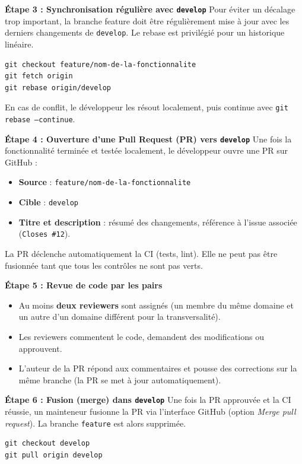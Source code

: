 \documentclass[11pt,a4paper]{article}
\begin{document}
\begin{etapebox}
\textbf{Étape 3 : Synchronisation régulière avec \texttt{develop}}
Pour éviter un décalage trop important, la branche feature doit être régulièrement mise à jour avec les derniers changements de \texttt{develop}. Le rebase est privilégié pour un historique linéaire.
\begin{verbatim}
git checkout feature/nom-de-la-fonctionnalite
git fetch origin
git rebase origin/develop
\end{verbatim}
En cas de conflit, le développeur les résout localement, puis continue avec \texttt{git rebase --continue}.
\end{etapebox}

\begin{etapebox}
\textbf{Étape 4 : Ouverture d’une Pull Request (PR) vers \texttt{develop}}
Une fois la fonctionnalité terminée et testée localement, le développeur ouvre une PR sur GitHub :
\begin{itemize}
    \item \textbf{Source} : \texttt{feature/nom-de-la-fonctionnalite}
    \item \textbf{Cible} : \texttt{develop}
    \item \textbf{Titre et description} : résumé des changements, référence à l’issue associée (\texttt{Closes \#12}).
\end{itemize}
La PR déclenche automatiquement la CI (tests, lint). Elle ne peut pas être fusionnée tant que tous les contrôles ne sont pas verts.
\end{etapebox}

\begin{etapebox}
\textbf{Étape 5 : Revue de code par les pairs}
\begin{itemize}
    \item Au moins \textbf{deux reviewers} sont assignés (un membre du même domaine et un autre d’un domaine différent pour la transversalité).
    \item Les reviewers commentent le code, demandent des modifications ou approuvent.
    \item L’auteur de la PR répond aux commentaires et pousse des corrections sur la même branche (la PR se met à jour automatiquement).
\end{itemize}
\end{etapebox}

\begin{etapebox}
\textbf{Étape 6 : Fusion (merge) dans \texttt{develop}}
Une fois la PR approuvée et la CI réussie, un mainteneur fusionne la PR via l’interface GitHub (option \textit{Merge pull request}). La branche \texttt{feature} est alors supprimée.
\begin{verbatim}
git checkout develop
git pull origin develop
\end{verbatim}
\end{etapebox}
\end{document}
